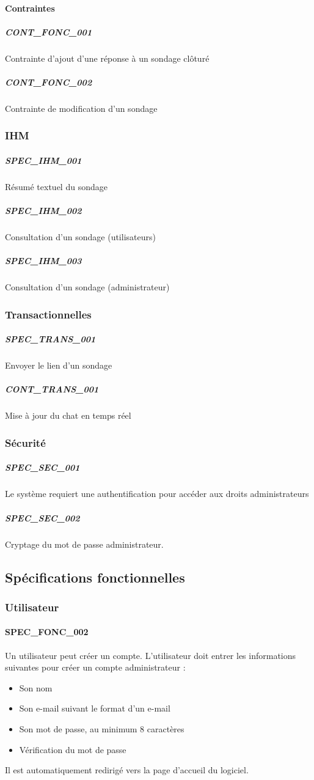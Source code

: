 \documentclass[]{report}
\begin{document}
\paragraph{Contraintes}
\subparagraph{CONT\_FONC\_001} Contrainte d’ajout d’une réponse à un sondage clôturé
\subparagraph{CONT\_FONC\_002} Contrainte de modification d’un sondage

\subsubsection{IHM}
\subparagraph{SPEC\_IHM\_001} Résumé textuel du sondage
\subparagraph{SPEC\_IHM\_002} Consultation d’un sondage (utilisateurs)
\subparagraph{SPEC\_IHM\_003} Consultation d’un sondage (administrateur)

\subsubsection{Transactionnelles}
\subparagraph{SPEC\_TRANS\_001} Envoyer le lien d’un sondage
\subparagraph{CONT\_TRANS\_001} Mise à jour du chat en temps réel

\subsubsection{Sécurité}
\subparagraph{SPEC\_SEC\_001} Le système requiert une authentification pour accéder aux droits administrateurs
\subparagraph{SPEC\_SEC\_002} Cryptage du mot de passe administrateur. 

\subsection{Spécifications fonctionnelles}

\subsubsection{Utilisateur}
\paragraph{SPEC\_FONC\_002} Un utilisateur peut créer un compte.
L’utilisateur doit entrer les informations suivantes pour créer un compte administrateur :
\begin{itemize}
\item Son nom
\item Son e-mail suivant le format d’un e-mail
\item Son mot de passe, au minimum 8 caractères
\item Vérification du mot de passe \end{itemize}
Il est automatiquement redirigé vers la page d’accueil du logiciel.
\end{document}
